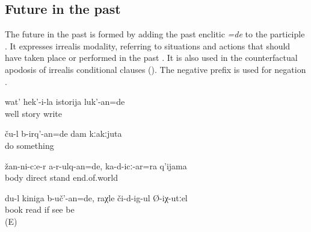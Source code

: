 
\subsection{Future in the past}
\label{ssec:Future in the past}

The future in the past is formed by adding the past enclitic \textit{=de} to the participle . It expresses irrealis modality, referring to situations and actions that should have taken place or performed in the past . It is also used in the counterfactual apodosis of irrealis conditional clauses  (). The negative prefix is used for negation .
%
\begin{exe}
	\ex	\label{ex:‎Her story (i.e. autobiography) should be written down}
	\gll	wat'	hek'-i-la	istorija	luk'-an=de\\
		well		story	write\\
	\glt	{}

	\ex	\label{ex:They would/should have done something for me}
	\gll	ču-l	b-irq'-an=de	dam	kːakːjuta \\
			do		something\\
	\glt	{}

	\ex	\label{ex:You should have not left your body, even if the end of the world comes}
	\gll	žan-ni-cːe-r	a-r-ulq-an=de,		ka-d-icː-ar=ra	q'ijama\\
		body	direct		stand	end.of.world\\
	\glt	{}

	\ex	\label{ex:I would have read the book if you (masc.) would have seen it}
	\gll	du-l	kiniga	b-uč'-an=de,	raχle	či-d-ig-ul	Ø-iχ-utːel\\
			book	read	if	see	be\\
	\glt	{} (E)
\end{exe}


